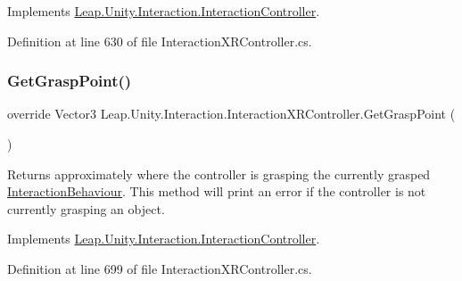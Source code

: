 Implements \mbox{\hyperlink{class_leap_1_1_unity_1_1_interaction_1_1_interaction_controller_ae5ccd0183ff87fd51107a5b082116ce0}{Leap.\+Unity.\+Interaction.\+Interaction\+Controller}}.



Definition at line 630 of file Interaction\+X\+R\+Controller.\+cs.

\mbox{\label{class_leap_1_1_unity_1_1_interaction_1_1_interaction_x_r_controller_acf5f67ce22587c6d638890d9af2ecadb}} 
\subsubsection{\texorpdfstring{GetGraspPoint()}{GetGraspPoint()}}
{\footnotesize\ttfamily override Vector3 Leap.\+Unity.\+Interaction.\+Interaction\+X\+R\+Controller.\+Get\+Grasp\+Point (\begin{DoxyParamCaption}{ }\end{DoxyParamCaption})\hspace{0.3cm}{\ttfamily [virtual]}}



Returns approximately where the controller is grasping the currently grasped \mbox{\hyperlink{class_leap_1_1_unity_1_1_interaction_1_1_interaction_behaviour}{Interaction\+Behaviour}}. This method will print an error if the controller is not currently grasping an object. 



Implements \mbox{\hyperlink{class_leap_1_1_unity_1_1_interaction_1_1_interaction_controller_aca84a24dd5f2f73a7c8bee6a15cea0a4}{Leap.\+Unity.\+Interaction.\+Interaction\+Controller}}.



Definition at line 699 of file Interaction\+X\+R\+Controller.\+cs.

\mbox{\label{class_leap_1_1_unity_1_1_interaction_1_1_interaction_x_r_controller_a6646ebf671991c5bc47a66b2129538b6}} 
